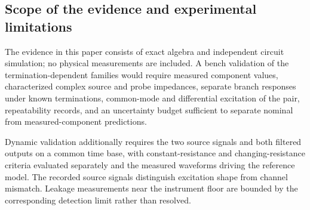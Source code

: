 \subsection{Scope of the evidence and experimental limitations}

The evidence in this paper consists of exact algebra and independent circuit simulation; no physical measurements are included. A bench validation of the termination-dependent families would require measured component values, characterized complex source and probe impedances, separate branch responses under known terminations, common-mode and differential excitation of the pair, repeatability records, and an uncertainty budget sufficient to separate nominal from measured-component predictions.

Dynamic validation additionally requires the two source signals and both filtered outputs on a common time base, with constant-resistance and changing-resistance criteria evaluated separately and the measured waveforms driving the reference model. The recorded source signals distinguish excitation shape from channel mismatch. Leakage measurements near the instrument floor are bounded by the corresponding detection limit rather than resolved.

